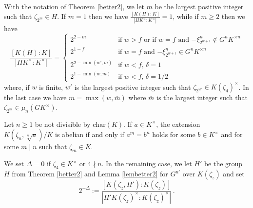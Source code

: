 \documentclass[10pt,a4paper]{amsart}
\newcommand{\ch}{\mathrm{char}}
\renewcommand{\geq}{\geqslant}
\begin{document}
\begin{lem}\label{lembetter2}
With the notation of Theorem \ref{better2}, we let $m$ be the largest positive integer such that $\zeta_{2^m}\in H$. If $m=1$ then we have 
$\frac{[K(H):K]}{|HK^\times:K^\times|}=1$, while if $m\geq 2$ then we have 
$$\frac{[K(H):K]}{|HK^\times:K^\times|}=\begin{cases} 
2^{2-m} & \text{if $w>f$ or if $w=f$ and $-\xi_{2^{w+1}}^n\notin G^nK^{\times n}$}\\
2^{1-f} & \text{if $w=f$ and $-\xi_{2^{w+1}}^n\in G^nK^{\times n}$}\\
2^{2-\min(w',m)} & \text{if $w<f$, $\delta=1$}\\
2^{1-\min(w,m)} & \text{if $w<f$, $\delta=1/2$}\end{cases}$$
where, if $w$ is finite, $w'$ is the largest positive integer such that $\zeta_{2^{w'}}\in K(\zeta_4)^\times$.
In the last case we have $m=\max(w, \overline{m})$ where $\overline{m}$ is the largest integer such that $\zeta_{2^{\overline{m}}}\in \mu_n(GK^\times)$.
\end{lem}

\begin{thm}\label{Schinzel-abelian}
Let $n\geq 1$ be not divisible by $\ch(K)$. 
If $a\in K^\times$, the extension $K(\zeta_{n}, \sqrt[n]{a})/K$ is abelian if and only if $a^{m}=b^{n}$ holds for some $b\in K^{\times}$ and for some $m\mid n$ such that $\zeta_{m}\in K$.
\end{thm}

\begin{defi}\label{Delta}
We set $\Delta=0$ if $\zeta_4\in K^\times$ or $4\nmid n$. In the remaining case, we let 
$H'$ be the group $H$ from Theorem \ref{better2} and Lemma \ref{lembetter2} for $G^{n'}$ over $K(\zeta_z)$ and set 
\begin{equation}\label{magicDelta}
2^{-\Delta}:=\frac{[K(\zeta_z, H'):K(\zeta_z)]}{|H'K(\zeta_z)^\times:K(\zeta_z)^\times|}\,.
\end{equation}
\end{defi}
\end{document}
